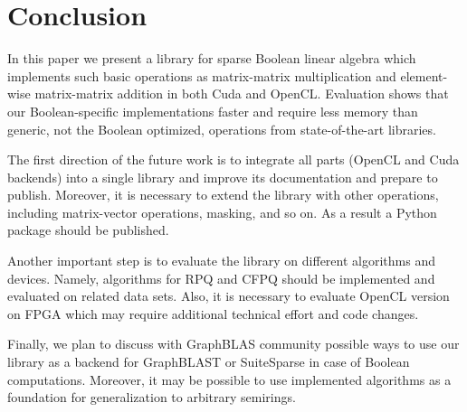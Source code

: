 \section{Conclusion}

In this paper we present a library for sparse Boolean linear algebra which implements such basic operations as matrix-matrix multiplication and element-wise matrix-matrix addition in both Cuda and OpenCL.
Evaluation shows that our Boolean-specific implementations faster and require less memory than generic, not the Boolean optimized, operations from state-of-the-art libraries.

The first direction of the future work is to integrate all parts (OpenCL and Cuda backends) into a single library and improve its documentation and prepare to publish.
Moreover, it is necessary to extend the library with other operations, including matrix-vector operations, masking, and so on.
As a result a Python package should be published.

Another important step is to evaluate the library on different algorithms and devices.
Namely, algorithms for RPQ and CFPQ should be implemented and evaluated on related data sets.
Also, it is necessary to evaluate OpenCL version on FPGA which may require additional technical effort and code changes.

Finally, we plan to discuss with GraphBLAS community possible ways to use our library as a backend for GraphBLAST or SuiteSparse in case of Boolean computations.
Moreover, it may be possible to use implemented algorithms as a foundation for generalization to arbitrary semirings.
